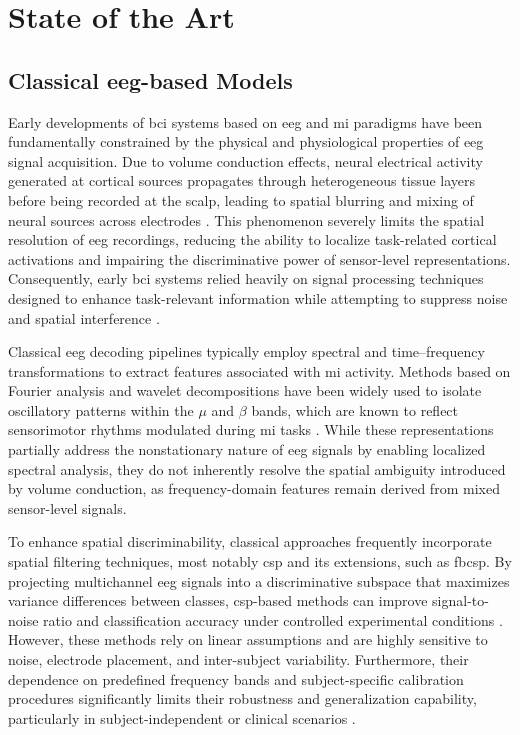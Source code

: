 \section{State of the Art}

\subsection{Classical \gls{eeg}-based Models}

Early developments of \gls{bci} systems based on \gls{eeg} and \gls{mi} paradigms have been fundamentally constrained by the physical and physiological properties of \gls{eeg} signal acquisition. Due to volume conduction effects, neural electrical activity generated at cortical sources propagates through heterogeneous tissue layers before being recorded at the scalp, leading to spatial blurring and mixing of neural sources across electrodes \cite{wang2019eeg}. This phenomenon severely limits the spatial resolution of \gls{eeg} recordings, reducing the ability to localize task-related cortical activations and impairing the discriminative power of sensor-level representations. Consequently, early \gls{bci} systems relied heavily on signal processing techniques designed to enhance task-relevant information while attempting to suppress noise and spatial interference \cite{singh2021comprehensive}.

Classical \gls{eeg} decoding pipelines typically employ spectral and time--frequency transformations to extract features associated with \gls{mi} activity. Methods based on Fourier analysis and wavelet decompositions have been widely used to isolate oscillatory patterns within the $\mu$ and $\beta$ bands, which are known to reflect sensorimotor rhythms modulated during \gls{mi} tasks \cite{pfurtscheller1999event,singh2021comprehensive}. While these representations partially address the nonstationary nature of \gls{eeg} signals by enabling localized spectral analysis, they do not inherently resolve the spatial ambiguity introduced by volume conduction, as frequency-domain features remain derived from mixed sensor-level signals.

To enhance spatial discriminability, classical approaches frequently incorporate spatial filtering techniques, most notably \gls{csp} and its extensions, such as \gls{fbcsp}. By projecting multichannel \gls{eeg} signals into a discriminative subspace that maximizes variance differences between classes, \gls{csp}-based methods can improve signal-to-noise ratio and classification accuracy under controlled experimental conditions \cite{wang2019eeg}. However, these methods rely on linear assumptions and are highly sensitive to noise, electrode placement, and inter-subject variability. Furthermore, their dependence on predefined frequency bands and subject-specific calibration procedures significantly limits their robustness and generalization capability, particularly in subject-independent or clinical scenarios \cite{maswanganyi2022statistical,saha2020intra}.

